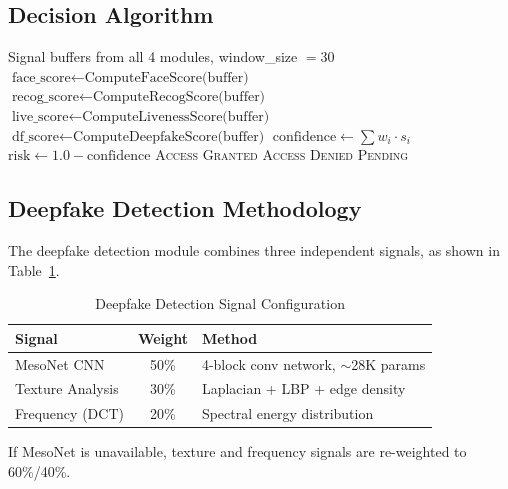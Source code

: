 \documentclass[conference,10pt]{IEEEtran}
\begin{document}
\subsection{Decision Algorithm}

\begin{algorithm}[H]
\caption{Multi-Signal Authentication Decision}
\label{alg:decision}
\begin{algorithmic}[1]
\Require Signal buffers from all 4 modules, window\_size $= 30$
\State $\text{face\_score} \gets \text{ComputeFaceScore(buffer)}$
\State $\text{recog\_score} \gets \text{ComputeRecogScore(buffer)}$
\State $\text{live\_score} \gets \text{ComputeLivenessScore(buffer)}$
\State $\text{df\_score} \gets \text{ComputeDeepfakeScore(buffer)}$
\State $\text{confidence} \gets \sum w_i \cdot s_i$ 
\State $\text{risk} \gets 1.0 - \text{confidence}$
    \State \Return \textsc{Access Granted}
    \State \Return \textsc{Access Denied}
\Else
    \State \Return \textsc{Pending}
\EndIf
\end{algorithmic}
\end{algorithm}

\subsection{Deepfake Detection Methodology}

The deepfake detection module combines three independent signals, as shown in Table~\ref{tab:deepfake_signals}.

\begin{table}[H]
\centering
\caption{Deepfake Detection Signal Configuration}
\label{tab:deepfake_signals}
\begin{tabular}{lcl}
\toprule
\textbf{Signal} & \textbf{Weight} & \textbf{Method} \\
\midrule
MesoNet CNN & 50\% & 4-block conv network, $\sim$28K params \\
Texture Analysis & 30\% & Laplacian + LBP + edge density \\
Frequency (DCT) & 20\% & Spectral energy distribution \\
\bottomrule
\end{tabular}
\end{table}

If MesoNet is unavailable, texture and frequency signals are re-weighted to 60\%/40\%.

\end{document}

